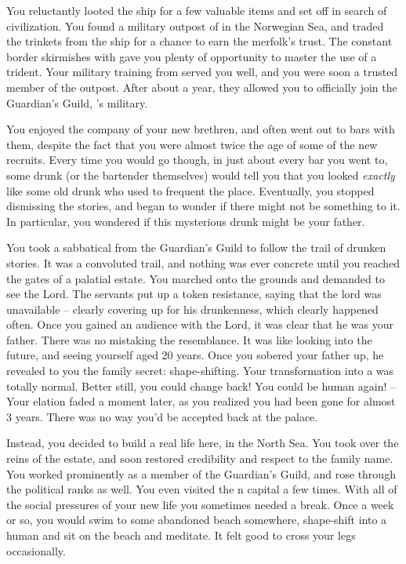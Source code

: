 \documentclass[char]{NeptuneBall}
\begin{document}
You reluctantly looted the ship for a few valuable items and set off in search of civilization. You found a military outpost of \pAtlantis{} in the Norwegian Sea, and traded the trinkets from the ship for a chance to earn the merfolk's trust.  The constant border skirmishes with \pPacifica{} gave you plenty of opportunity to master the use of a trident. Your military training from \pAmerica{} served you well, and you were soon a trusted member of the outpost. After about a year, they allowed you to officially join the Guardian's Guild, \pAtlantis{}'s military.

You enjoyed the company of your new brethren, and often went out to bars with them, despite the fact that you were almost twice the age of some of the new recruits. Every time you would go though, in just about every bar you went to, some drunk (or the bartender themselves) would tell you that you looked \emph{exactly} like some old drunk who used to frequent the place. Eventually, you stopped dismissing the stories, and began to wonder if there might not be something to it. In particular, you wondered if this mysterious drunk might be your father.

You took a sabbatical from the Guardian's Guild to follow the trail of drunken stories. It was a convoluted trail, and nothing was ever concrete until you reached the gates of a palatial estate. You marched onto the grounds and demanded to see the Lord. The servants put up a token resistance, saying that the lord was unavailable -- clearly covering up for his drunkenness, which clearly happened often. Once you gained an audience with the Lord, it was clear that he was your father. There was no mistaking the resemblance. It was like looking into the future, and seeing yourself aged 20 years. Once you sobered your father up, he revealed to you the family secret: shape-shifting. Your transformation into a \cGeneral{\mer} was totally normal. Better still, you could change back! You could be human again! -- Your elation faded a moment later, as you realized you had been gone for almost 3 years. There was no way you'd be accepted back at the palace.

Instead, you decided to build a real life here, in the North Sea. You took over the reins of the estate, and soon restored credibility and respect to the family name. You worked prominently as a member of the Guardian's Guild, and rose through the political ranks as well. You even visited the \pAtlantis{}n capital a few times. With all of the social pressures of your new life you sometimes needed a break. Once a week or so, you would swim to some abandoned beach somewhere, shape-shift into a human and sit on the beach and meditate. It felt good to cross your legs occasionally.
\end{document}
